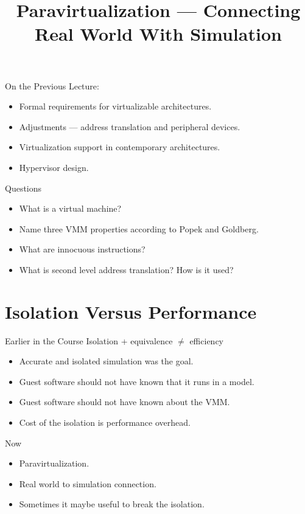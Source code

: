 
\title{Paravirtualization --- Connecting Real World With Simulation}



\startslides

\begin{frame}{On the Previous Lecture:}
  \begin{itemize}
    \item Formal requirements for virtualizable architectures.
    \item Adjustments --- address translation and peripheral devices.
    \item Virtualization support in contemporary architectures.
    \item Hypervisor design.
  \end{itemize}
\end{frame}

\begin{frame}{Questions}
  \begin{itemize}
    \item What is a virtual machine?\pause
    \item Name three VMM properties according to Popek and Goldberg.\pause
    \item What are innocuous instructions?\pause
    \item What is second level address translation? \pause How is it used?
  \end{itemize}
\end{frame}

\section{Isolation Versus Performance}

\begin{frame}{Earlier in the Course}
  Isolation + equivalence $\neq$ efficiency
  \begin{itemize}
    \item Accurate and isolated simulation was the goal.
    \item Guest software should not have known that it runs in a model.
    \item Guest software should not have known about the VMM.
    \item Cost of the isolation is performance overhead.
  \end{itemize}
\end{frame}

\begin{frame}{Now}
  \begin{itemize}
    \item Paravirtualization.
    \item Real world to simulation connection.
    \item Sometimes it maybe useful to break the isolation.
  \end{itemize}
\end{frame}

